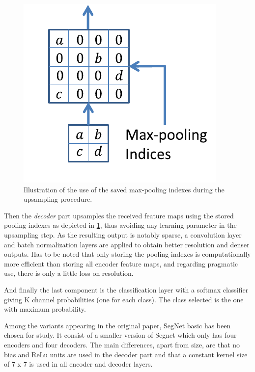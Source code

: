 \begin{figure}[!htbp]
\begin{center}
\includegraphics[scale=0.5]{seg_idx.png}
\caption{Illustration of the use of the saved max-pooling indexes during the upsampling procedure.}
\label{segidx}
\end{center}
\end{figure}

Then the \textit{decoder} part upsamples the received feature maps using the stored pooling indexes as depicted in \ref{segidx}, thus avoiding any learning parameter in the upsampling step. As the resulting output is notably sparse, a convolution layer and batch normalization layers are applied to obtain better resolution and denser outputs. Has to be noted that only storing the pooling indexes is computationally more efficient than storing all encoder feature maps, and regarding pragmatic use, there is only a little loss on resolution.\newline 

And finally the last component is the classification layer with a softmax classifier giving K channel probabilities (one for each class). The class selected is the one with maximum probability.\newline

Among the variants appearing in the original paper, SegNet basic has been chosen for study. It consist of a smaller version of Segnet which only has four encoders and four decoders. The main differences, apart from size, are that no bias and ReLu units are used in the decoder part and that a constant kernel size of 7 x 7 is used in all encoder and decoder layers.\newline

